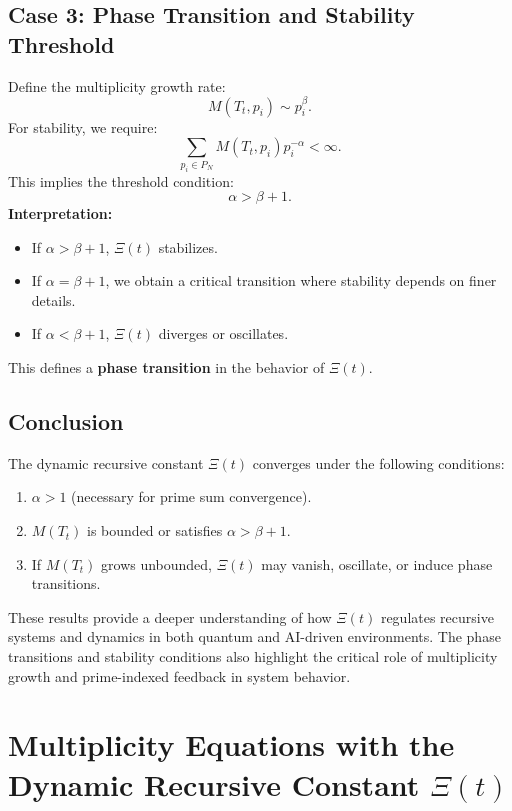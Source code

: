 \documentclass{article}
\theoremstyle{plain}
\begin{document}
\begin{itemize}
\subsection{Case 3: Phase Transition and Stability Threshold}
Define the multiplicity growth rate:
\begin{equation}
    M(T_t, p_i) \sim p_i^{\beta}.
\end{equation}
For stability, we require:
\begin{equation}
    \sum_{p_i \in P_N} M(T_t, p_i) p_i^{-\alpha} < \infty.
\end{equation}
This implies the threshold condition:
\begin{equation}
    \alpha > \beta + 1.
\end{equation}
\textbf{Interpretation:}
\begin{itemize}
    \item If \( \alpha > \beta + 1 \), \(\Xi(t) \) stabilizes.
    \item If \( \alpha = \beta + 1 \), we obtain a critical transition where stability depends on finer details.
    \item If \( \alpha < \beta + 1 \), \(\Xi(t) \) diverges or oscillates.
\end{itemize}
This defines a \textbf{phase transition} in the behavior of \(\Xi(t) \).

\subsection{Conclusion}
The dynamic recursive constant \(\Xi(t) \) converges under the following conditions:
\begin{enumerate}
    \item \( \alpha > 1 \) (necessary for prime sum convergence).
    \item \( M(T_t) \) is bounded or satisfies \( \alpha > \beta + 1 \).
    \item If \( M(T_t) \) grows unbounded, \(\Xi(t) \) may vanish, oscillate, or induce phase transitions.
\end{enumerate}
These results provide a deeper understanding of how \(\Xi(t) \) regulates recursive systems and dynamics in both quantum and AI-driven environments. The phase transitions and stability conditions also highlight the critical role of multiplicity growth and prime-indexed feedback in system behavior.


\section{Multiplicity Equations with the Dynamic Recursive Constant \(\Xi(t) \)}


\end{itemize}
\end{document}
